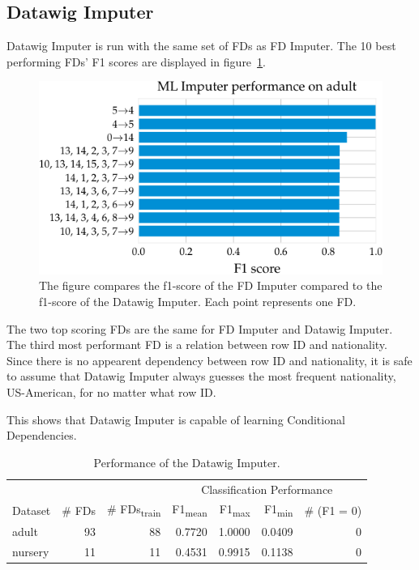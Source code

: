 \subsection{Datawig Imputer}
Datawig Imputer is run with the same set of FDs as FD Imputer.
The 10 best performing FDs' F1 scores are displayed in figure~\ref{fig:f1_ml_adult}.
\begin{figure}[h]
     \centering
     \includegraphics[width=.8\textwidth]{../figures/adult/f1_ml_imputer_adult.pdf}
     \caption{The figure compares the f1-score of the FD Imputer compared to the f1-score of the Datawig Imputer. Each point represents one FD.}
     \label{fig:f1_ml_adult}
 \end{figure}
The two top scoring FDs are the same for FD Imputer and Datawig Imputer.
The third most performant FD is a relation between row ID and nationality.
Since there is no appearent dependency between row ID and nationality, it is safe to assume that Datawig Imputer always guesses the most frequent nationality, US-American, for no matter what row ID.

This shows that Datawig Imputer is capable of learning Conditional Dependencies.

\begin{table}[ht]
    \centering
    \begin{tabular}{lrrrrrr}
        \toprule
        & & & \multicolumn{4}{c}{Classification Performance} \\
        \cmidrule(lr{.25em}){4-7}
        Dataset & \# FDs & \# FDs\textsubscript{train} & F1\textsubscript{mean} & F1\textsubscript{max} & F1\textsubscript{min} & \# (F1 = 0) \\
        \midrule
        adult & 93 & 88 & 0.7720 & 1.0000 & 0.0409 & 0 \\
        nursery & 11 & 11 & 0.4531 & 0.9915 & 0.1138 & 0 \\
        \bottomrule
    \end{tabular}
    \caption{Performance of the Datawig Imputer.}\label{tab:ml-imputer-performance}
\end{table}

